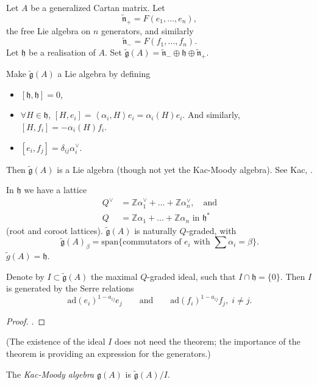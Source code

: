 Let $A$ be a generalized Cartan matrix. Let 
$$
\tilde{\mathfrak{n}}_+=F(e_1,\ldots,e_n),
$$ 
the free Lie algebra on $n$ generators, and similarly
$$
\tilde{\mathfrak{n}}_-=F(f_1,\ldots,f_n).
$$
Let $\mathfrak{h}$ be a realisation of $A$. 
Set $\tilde{\mathfrak{g}}(A)
=\tilde{\mathfrak{n}}_- \oplus \mathfrak{h} \oplus \tilde{\mathfrak{n}}_+$.

Make $\tilde{\mathfrak{g}}(A)$ a Lie algebra by defining
\begin{itemize}
\item $[\mathfrak{h},\mathfrak{h}]=0$,
\item $\forall  H \in \mathfrak{h}$, $[H,e_i]=\left<\alpha_i,H\right>e_i
=\alpha_i(H)e_i$. And similarly, $[H,f_i]=-\alpha_i(H)f_i$.
\item $[e_i,f_j]=\delta_{ij}\alpha_i^\vee$.
\end{itemize}
Then $\tilde{\mathfrak{g}}(A)$ is a Lie algebra (though not yet the Kac-Moody
algebra). See Kac, \cite[Thorem 1.2]{IDLA}.

\begin{remark}
\label{remark-lattice}
In $\mathfrak{h}$ we have a lattice
\begin{align*}
Q^\vee&=\mathbb{Z}\alpha_1^\vee+\ldots+\mathbb{Z}\alpha_n^\vee,\quad
\text{and}\\
Q&=\mathbb{Z}\alpha_1+\ldots+\mathbb{Z}\alpha_n\text{ in }\mathfrak{h}^*
\end{align*}
(root and coroot lattices). $\tilde{\mathfrak{g}}(A)$ is naturally $Q$-graded,
with 
$$
\tilde{\mathfrak{g}}(A)_\beta=\text{span}\{
\text{commutators of $e_i$ with $\sum \alpha_i=\beta$}\}.
$$
$\tilde{g}(A)=\mathfrak{h}$.

\begin{theorem}
\label{theorem-Gabber-Kac}
Denote by $I \subset \tilde{\mathfrak{g}}(A)$ the maximal $Q$-graded ideal, such
that $I \cap\mathfrak{h}=\{0\}$. 
Then $I$ is generated by the Serre relations 
$$
\text{ad}(e_i)^{1-a_{ij}}e_j\qquad \text{and}\qquad 
\text{ad}(f_i)^{1-a_{ij}}f_j,\; i\neq j.
$$
\end{theorem}

\begin{proof}
\cite[Theorem 9.11]{IDLA}.
\end{proof}

(The existence of the ideal $I$ does not need the theorem; 
the importance of the theorem is providing an
expression for the generators.)

\begin{definition}
\label{definition-Kac-Moody-algebra}
The {\it Kac-Moody algebra} $\mathfrak{g}(A)$ is $\tilde{\mathfrak{g}}(A)/I$.
\end{definition}

\end{remark}

